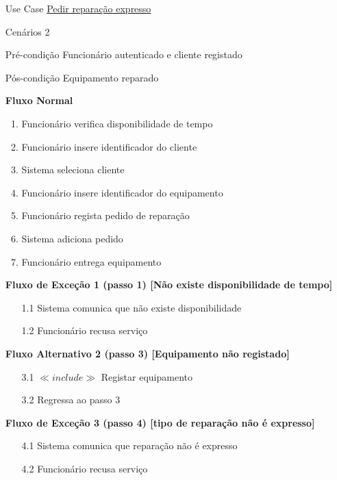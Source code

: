 \documentclass[../relatorio.tex]{subfiles}
\begin{document}
\begin{itemize}
    \item[Use Case] {\underline{Pedir reparação expresso}}
    \item[Cenários] {2}
    \item[Pré-condição] {Funcionário autenticado e cliente registado}
    \item[Pós-condição] {Equipamento reparado}
          \begin{flushleft}
              \textbf{Fluxo Normal}
          \end{flushleft}
          \begin{enumerate}
              \item Funcionário verifica disponibilidade de tempo
              \item Funcionário insere identificador do cliente
              \item Sistema seleciona cliente
              \item Funcionário insere identificador do equipamento
              \item Funcionário regista pedido de reparação
              \item Sistema adiciona pedido
              \item Funcionário entrega equipamento
          \end{enumerate}

          \begin{flushleft}
              \textbf{Fluxo de Exceção 1 (passo 1) [Não existe disponibilidade de tempo]}
          \end{flushleft}
          \begin{itemize}
              \item[1.1]{Sistema comunica que não existe disponibilidade}
              \item[1.2]{Funcionário recusa serviço}
          \end{itemize}
          \begin{flushleft}
              \textbf{Fluxo Alternativo 2 (passo 3) [Equipamento não registado]}
          \end{flushleft}
          \begin{itemize}
              \item[3.1] $\ll include \gg$ Registar equipamento
              \item[3.2] Regressa ao passo 3
          \end{itemize}
          \begin{flushleft}
              \textbf{Fluxo de Exceção 3 (passo 4) [tipo de reparação não é expresso]}
          \end{flushleft}
          \begin{itemize}
              \item[4.1]{Sistema comunica que reparação não é expresso}
              \item[4.2]{Funcionário recusa serviço}
          \end{itemize}
\end{itemize}
\end{document}
